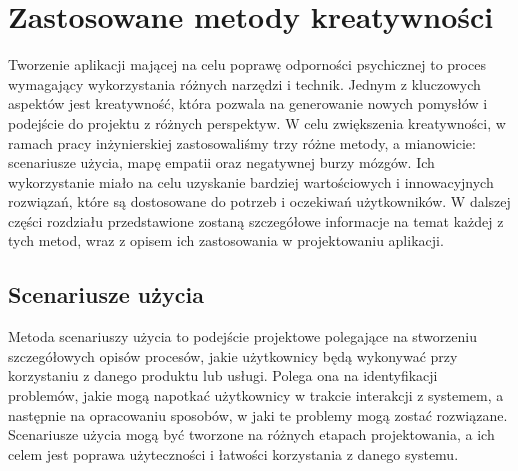 \section{Zastosowane metody kreatywności}

Tworzenie aplikacji mającej na celu poprawę odporności psychicznej to proces
wymagający wykorzystania różnych narzędzi i technik. Jednym z kluczowych
aspektów jest kreatywność, która pozwala na generowanie nowych pomysłów i
podejście do projektu z różnych perspektyw. W celu zwiększenia kreatywności, w
ramach pracy inżynierskiej zastosowaliśmy trzy różne metody, a mianowicie:
scenariusze użycia, mapę empatii oraz negatywnej burzy mózgów. Ich wykorzystanie
miało na celu uzyskanie bardziej wartościowych i innowacyjnych rozwiązań, które
są dostosowane do potrzeb i oczekiwań użytkowników. W dalszej części rozdziału
przedstawione zostaną szczegółowe informacje na temat każdej z tych metod, wraz
z opisem ich zastosowania w projektowaniu aplikacji.

\subsection{Scenariusze użycia}
Metoda scenariuszy użycia to podejście projektowe polegające na stworzeniu
szczegółowych opisów procesów, jakie użytkownicy będą wykonywać przy korzystaniu
z danego produktu lub usługi. Polega ona na identyfikacji problemów, jakie mogą
napotkać użytkownicy w trakcie interakcji z systemem, a następnie na opracowaniu
sposobów, w jaki te problemy mogą zostać rozwiązane. Scenariusze użycia mogą być
tworzone na różnych etapach projektowania, a ich celem jest poprawa użyteczności
i łatwości korzystania z danego systemu.

